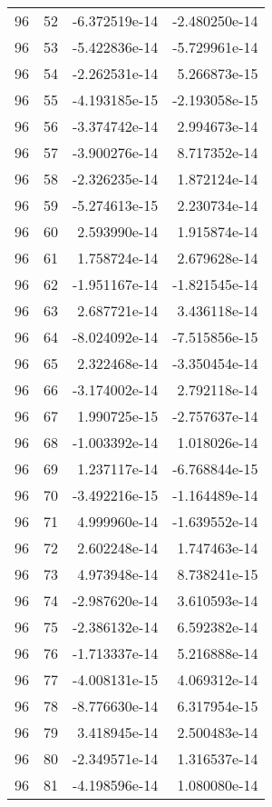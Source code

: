 \begin{tabular}{rrrr}
  96 &   52 & -6.372519e-14 & -2.480250e-14 \\
  96 &   53 & -5.422836e-14 & -5.729961e-14 \\
  96 &   54 & -2.262531e-14 &  5.266873e-15 \\
  96 &   55 & -4.193185e-15 & -2.193058e-15 \\
  96 &   56 & -3.374742e-14 &  2.994673e-14 \\
  96 &   57 & -3.900276e-14 &  8.717352e-14 \\
  96 &   58 & -2.326235e-14 &  1.872124e-14 \\
  96 &   59 & -5.274613e-15 &  2.230734e-14 \\
  96 &   60 &  2.593990e-14 &  1.915874e-14 \\
  96 &   61 &  1.758724e-14 &  2.679628e-14 \\
  96 &   62 & -1.951167e-14 & -1.821545e-14 \\
  96 &   63 &  2.687721e-14 &  3.436118e-14 \\
  96 &   64 & -8.024092e-14 & -7.515856e-15 \\
  96 &   65 &  2.322468e-14 & -3.350454e-14 \\
  96 &   66 & -3.174002e-14 &  2.792118e-14 \\
  96 &   67 &  1.990725e-15 & -2.757637e-14 \\
  96 &   68 & -1.003392e-14 &  1.018026e-14 \\
  96 &   69 &  1.237117e-14 & -6.768844e-15 \\
  96 &   70 & -3.492216e-15 & -1.164489e-14 \\
  96 &   71 &  4.999960e-14 & -1.639552e-14 \\
  96 &   72 &  2.602248e-14 &  1.747463e-14 \\
  96 &   73 &  4.973948e-14 &  8.738241e-15 \\
  96 &   74 & -2.987620e-14 &  3.610593e-14 \\
  96 &   75 & -2.386132e-14 &  6.592382e-14 \\
  96 &   76 & -1.713337e-14 &  5.216888e-14 \\
  96 &   77 & -4.008131e-15 &  4.069312e-14 \\
  96 &   78 & -8.776630e-14 &  6.317954e-15 \\
  96 &   79 &  3.418945e-14 &  2.500483e-14 \\
  96 &   80 & -2.349571e-14 &  1.316537e-14 \\
  96 &   81 & -4.198596e-14 &  1.080080e-14 \\

\end{tabular}
